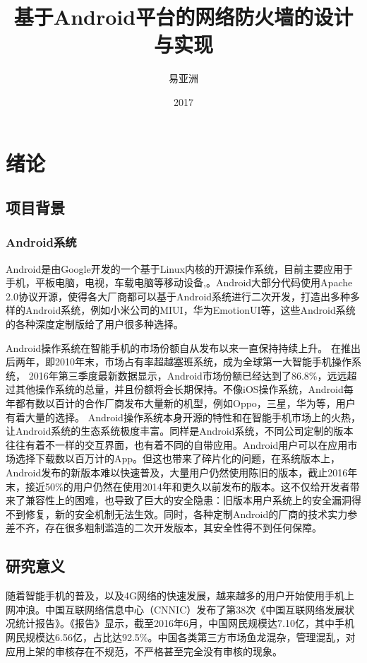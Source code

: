 \documentclass[format=final, language=chinese, degree=fyp]{hustthesis}
\title{基于Android平台的网络防火墙的设计与实现}{An Implementation of Android Firewall}
\author{易亚洲}{Yazhou Yi}
\date{2017}{6}{10}
\begin{document}
\frontmatter
\maketitle
\makeabstract
\tableofcontents
\listoffigures
\listoftables
\mainmatter

\chapter{绪论}\label{chapter:1}
\section{项目背景}

\subsection{Android系统}
Android是由Google开发的一个基于Linux内核的开源操作系统，目前主要应用于手机，平板电脑，电视，车载电脑等移动设备,。Android大部分代码使用Apache 2.0协议开源，使得各大厂商都可以基于Android系统进行二次开发，打造出多种多样的Android系统，例如小米公司的MIUI，华为EmotionUI等，这些Android系统的各种深度定制版给了用户很多种选择。

Android操作系统在智能手机的市场份额自从发布以来一直保持持续上升。
在推出后两年，即2010年末，市场占有率超越塞班系统，成为全球第一大智能手机操作系统，
2016年第三季度最新数据显示，Android市场份额已经达到了86.8\%，远远超过其他操作系统的总量，并且份额将会长期保持。不像iOS操作系统，Android每年都有数以百计的合作厂商发布大量新的机型，例如Oppo，三星，华为等，用户有着大量的选择。
Android操作系统本身开源的特性和在智能手机市场上的火热，让Android系统的生态系统极度丰富。同样是Android系统，不同公司定制的版本往往有着不一样的交互界面，也有着不同的自带应用。Android用户可以在应用市场选择下载数以百万计的App。但这也带来了碎片化的问题，在系统版本上，Android发布的新版本难以快速普及，大量用户仍然使用陈旧的版本，截止2016年末，接近50\%的用户仍然在使用2014年和更久以前发布的版本。这不仅给开发者带来了兼容性上的困难，也导致了巨大的安全隐患：旧版本用户系统上的安全漏洞得不到修复，新的安全机制无法生效。同时，各种定制Android的厂商的技术实力参差不齐，存在很多粗制滥造的二次开发版本，其安全性得不到任何保障。


\section{研究意义}

随着智能手机的普及，以及4G网络的快速发展，越来越多的用户开始使用手机上网冲浪。中国互联网络信息中心（CNNIC）发布了第38次《中国互联网络发展状况统计报告》。《报告》显示，截至2016年6月，中国网民规模达7.10亿，其中手机网民规模达6.56亿，占比达92.5\%。中国各类第三方市场鱼龙混杂，管理混乱，对应用上架的审核存在不规范，不严格甚至完全没有审核的现象。
\end{document}
